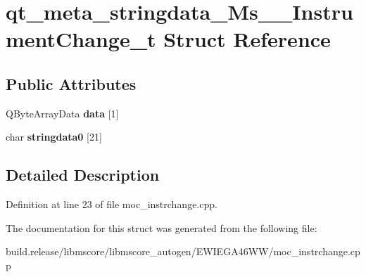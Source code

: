 \hypertarget{structqt__meta__stringdata___ms_____instrument_change__t}{}\section{qt\+\_\+meta\+\_\+stringdata\+\_\+\+Ms\+\_\+\+\_\+\+Instrument\+Change\+\_\+t Struct Reference}
\label{structqt__meta__stringdata___ms_____instrument_change__t}
\subsection*{Public Attributes}
\begin{DoxyCompactItemize}
\item 
\mbox{\label{structqt__meta__stringdata___ms_____instrument_change__t_a5b33da8133eea02a1e1d029c8e887f38}} 
Q\+Byte\+Array\+Data {\bfseries data} \mbox{[}1\mbox{]}
\item 
\mbox{\label{structqt__meta__stringdata___ms_____instrument_change__t_a479ceeee98ab395fef6492a38499a715}} 
char {\bfseries stringdata0} \mbox{[}21\mbox{]}
\end{DoxyCompactItemize}


\subsection{Detailed Description}


Definition at line 23 of file moc\+\_\+instrchange.\+cpp.



The documentation for this struct was generated from the following file\+:\begin{DoxyCompactItemize}
\item 
build.\+release/libmscore/libmscore\+\_\+autogen/\+E\+W\+I\+E\+G\+A46\+W\+W/moc\+\_\+instrchange.\+cpp\end{DoxyCompactItemize}
